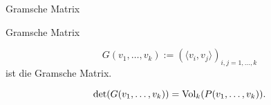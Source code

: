 \documentclass[class=article, crop=false]{standalone}
\begin{document}
\begin{zettel}{Gramsche Matrix}
\begin{flashcard}[j4ezi09m]{Gramsche Matrix}
	\begin{definition}
		\[
			G( v_1,\dots,v_k ):= \left(\langle v_i,v_j\rangle \right)_{i,j = 1,\dots,k}
		\] ist die Gramsche Matrix.
	\end{definition}
\end{flashcard}

\begin{theorem}
	\[
		\det(G ( v_1,\dots,v_k)) = \operatorname{Vol}_k(P(v_1,\dots,v_k))
	.\]
\end{theorem}
\end{zettel}
\end{document}
